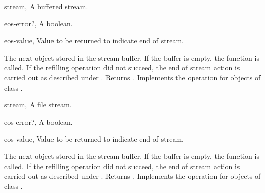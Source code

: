 \begin{optDefinition}
\begin{specargs}
    \item[stream, \classref{buffered-stream}] A buffered stream.
    \item[eos-error?, \classref{object}] A boolean.
    \item[eos-value, \classref{object}] Value to be returned to indicate end of
    stream.
\end{specargs}
%
\result%
The next object stored in the stream buffer.  If the buffer is empty,
the function  is called. If the refilling operation did
not succeed, the end of stream action is carried out as described under
.  Returns \true.
%
\remarks%
Implements the  operation for objects of class
.

\begin{specargs}
    \item[stream, \classref{file-stream}] A file stream.
    \item[eos-error?, \classref{object}] A boolean.
    \item[eos-value, \classref{object}] Value to be returned to indicate end of
    stream.
\end{specargs}
%
\result%
The next object stored in the stream buffer.  If the buffer is empty,
the function  is called. If the refilling operation did
not succeed, the end of stream action is carried out as described under
.  Returns \true.
%
\remarks%
Implements the  operation for objects of class
.



\end{optDefinition}
